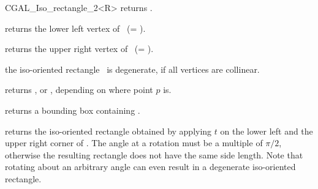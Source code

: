 \begin {classtemplate} {CGAL_Iso_rectangle_2<R>}
       {returns  .}

       {returns the lower left vertex of \var\ (= ).}


       {returns the upper right vertex of \var\ (= ).}


       {the iso-oriented rectangle \var\ is degenerate, if all vertices
        are collinear.}


       {returns ,  or 
        , depending on where point $p$ is.}

       {}

       {}

       {}

       {returns a bounding box containing \var. }

       {returns the iso-oriented rectangle obtained by applying $t$ on 
        the lower left and the upper right corner of \var.
        \precond The angle at a rotation must be a multiple of $\pi/2$,
        otherwise the resulting rectangle does not have the same side length.
        Note that rotating about an arbitrary angle can even result in
        a degenerate  iso-oriented rectangle.}





\end {classtemplate} 

%
